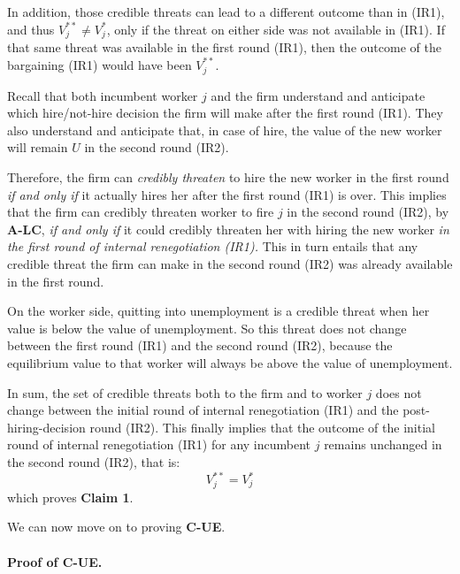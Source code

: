 In addition, those credible threats can lead to a different outcome than in
(IR1), and thus $V_j^{**} \neq V_j^*$, only if the threat on either side was
not available in (IR1). If that same threat was available in the first round
(IR1), then the outcome of the bargaining (IR1) would have been $V_j^{**}$.

Recall that both incumbent worker $j$ and the firm understand and anticipate
which hire/not-hire decision the firm will make after the first round (IR1).
They also understand and anticipate that, in case of hire, the value of the
new worker will remain $U$ in the second round (IR2).

Therefore, the firm can \textit{credibly threaten} to hire the new worker in
the first round \textit{if and only if} it actually hires her after the
first round (IR1) is over. This implies that the firm can credibly threaten
worker to fire $j$ in the second round (IR2), by \textbf{A-LC}, \textit{if
and only if} it could credibly threaten her with hiring the new worker
\textit{in the first round of internal renegotiation (IR1).} This in turn
entails that any credible threat the firm can make in the second round
(IR2) was already available in the first round.

On the worker side, quitting into unemployment is a credible threat
when her value is below the value of unemployment. So this threat does not
change between the first round (IR1) and the second round (IR2), because the
equilibrium value to that worker will always be above the value of
unemployment.

In sum, the set of credible threats both to the firm and to worker $j$ does
not change between the initial round of internal renegotiation (IR1) and the
post-hiring-decision round (IR2). This finally implies that the outcome of
the initial round of internal renegotiation (IR1) for any incumbent $j$
remains unchanged in the second round (IR2), that is:
\begin{equation*}
V_j^{**} = V_j^*
\end{equation*}
which proves \textbf{Claim 1}.

We can now move on to proving \textbf{C-UE}.

\paragraph{Proof of C-UE.}

